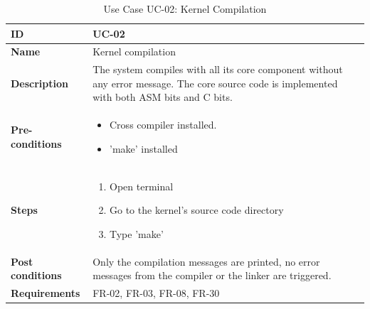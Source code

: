 \begin{table}[H]
    \centering
    \begin{tabular}{| p{3cm} | p{7cm} |}
    \hline
    \textbf{ID}             & UC-02 \\ \hline
    \textbf{Name}           & Kernel compilation \\ \hline
    \textbf{Description}    & The system compiles with all its core component without any error message. The core source code is implemented with both ASM bits and C bits.\\ \hline
    \textbf{Pre-conditions} &   \begin{itemize}
                                    \item Cross compiler installed.
                                    \item 'make' installed
                                \end{itemize} \\ \hline
    \textbf{Steps}          &   \begin{enumerate}
                                    \item Open terminal
                                    \item Go to the kernel's source code directory
                                    \item Type 'make'
                                \end{enumerate}
 \\ \hline
    \textbf{Post conditions} & Only the compilation messages are printed, no error messages from the compiler or the linker are triggered. \\ \hline
    \textbf{Requirements}       &  FR-02, FR-03, FR-08, FR-30\\ \hline
    \end{tabular}
    \caption{Use Case UC-02: Kernel Compilation}
\end{table}


